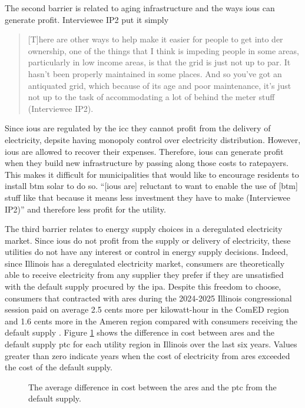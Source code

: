 The second barrier is related to aging infrastructure and the ways \acp{iou} can
generate profit. Interviewee IP2 put it simply
\begin{quote}
     [T]here are other ways to help make it easier for people to get into
     \acs{der} ownership, one of the things that I think is impeding people in
     some areas, particularly in low income areas, is that the grid is just not
     up to par. It hasn't been properly maintained in some places. And so you've
     got an antiquated grid, which because of its age and poor maintenance, it's
     just not up to the task of accommodating a lot of behind the meter stuff
     (Interviewee IP2).
\end{quote}
Since \acfp{iou} are regulated by the \ac{icc} they cannot profit from the
delivery of electricity, depsite having monopoly control over electricity
distribution. However, \acp{iou} are allowed to recover their expenses.
Therefore, \acp{iou} can generate profit when they build new infrastructure by
passing along those costs to ratepayers. This makes it difficult for
municipalities that would like to encourage residents to install \ac{btm} solar
to do so. ``[\acp{iou} are] reluctant to want to enable the use of [\ac{btm}]
stuff like that because it means less investment they have to make (Interviewee
IP2)'' and therefore less profit for the utility.

The third barrier relates to energy supply choices in a deregulated electricity
market. Since \acp{iou} do not profit from the supply or delivery of
electricity, these utilities do not have any interest or control in energy
supply decisions. Indeed, since Illinois has a deregulated electricity market,
consumers are theoretically able to receive electricity from any supplier they
prefer if they are unsatisfied with the default supply procured by the \ac{ipa}.
Despite this freedom to choose, consumers that contracted with \ac{ares} during
the 2024-2025 Illinois congressional session paid on average 2.5 cents more per
kilowatt-hour in the ComED region and 1.6 cents more in the Ameren region
compared with consumers receiving the default supply
\cite{office_of_retail_market_development_2025_2025}. Figure \ref{fig:ares-ptc}
shows the difference in cost between \ac{ares} and the default supply \ac{ptc}
for each utility region in Illinois over the last six years. Values greater than
zero indicate years when the cost of electricity from \ac{ares} exceeded the
cost of the default supply.

\begin{figure}[ht!]
    \centering
    \resizebox{0.9\columnwidth}{!}{}
    \caption{The average difference in cost between the \ac{ares} and the
    \ac{ptc} from the default supply.}
    \label{fig:ares-ptc}
\end{figure}

